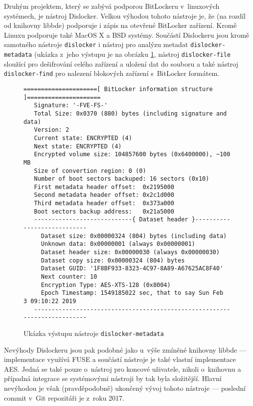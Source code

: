
Druhým projektem, který se zabývá podporou BitLockeru v~linuxových systémech, je nástroj Dislocker. Velkou výhodou tohoto nástroje je, že (na rozdíl od knihovny libbde) podporuje i zápis na otevřené BitLocker zařízení. Kromě Linuxu podporuje také MacOS X a BSD systémy. Součástí Dislockeru jsou kromě samotného nástroje \texttt{dislocker} i nástroj pro analýzu metadat \texttt{dislocker-metadata} (ukázka z~jeho výstupu je na obrázku \ref{fig:dislocker-metadata}, nástroj \texttt{dislocker-file} sloužící pro dešifrování celého zařízení a uložení dat do souboru a také nástroj \texttt{dislocker-find} pro nalezení blokových zařízení s~BitLocker formátem.

\begin{figure}[h]
		\centering
		\captionsetup{width=0.65\linewidth}
\begin{lstlisting}[frame=none, basicstyle=\ttfamily\small, columns=fullflexible, keepspaces=true]
 =====================[ BitLocker information structure ]=====================
   Signature: '-FVE-FS-'
   Total Size: 0x0370 (880) bytes (including signature and data)
   Version: 2
   Current state: ENCRYPTED (4)
   Next state: ENCRYPTED (4)
   Encrypted volume size: 104857600 bytes (0x6400000), ~100 MB
   Size of convertion region: 0 (0)
   Number of boot sectors backuped: 16 sectors (0x10)
   First metadata header offset:  0x2195000
   Second metadata header offset: 0x2c1d000
   Third metadata header offset:  0x373a000
   Boot sectors backup address:   0x21a5000
   ----------------------------{ Dataset header }----------------------------
     Dataset size: 0x00000324 (804) bytes (including data)
     Unknown data: 0x00000001 (always 0x00000001)
     Dataset header size: 0x00000030 (always 0x00000030)
     Dataset copy size: 0x00000324 (804) bytes
     Dataset GUID: '1F8BF933-8323-4C97-8A89-A67625AC8F40'
     Next counter: 10
     Encryption Type: AES-XTS-128 (0x8004)
     Epoch Timestamp: 1549185022 sec, that to say Sun Feb  3 09:10:22 2019
   --------------------------------------------------------------------------

\end{lstlisting}
		\caption{Ukázka výstupu nástroje \texttt{dislocker-metadata}}
		\label{fig:dislocker-metadata}
\end{figure}

Nevýhody Dislockeru jsou pak podobné jako u~výše zmíněné knihovny libbde --- implementace využívá FUSE a součástí nástroje je také vlastní implementace AES. Jedná se také pouze o~nástroj pro koncové uživatele, nikoli o~knihovnu a případná integrace se systémovými nástroji by tak byla složitější. Hlavní nevýhodou je však (pravděpodobně) ukončený vývoj tohoto nástroje --- poslední commit v~Git repozitáři je z~roku 2017.

